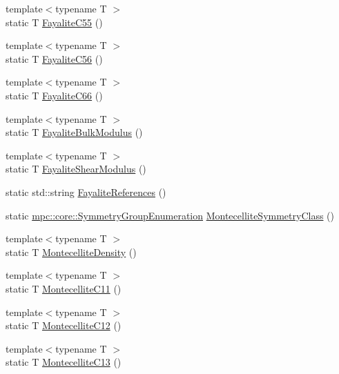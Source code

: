\begin{DoxyCompactItemize}
\item 
{\footnotesize template$<$typename T $>$ }\\static T \mbox{\hyperlink{namespacempc_1_1data_a26a98cb1967f16732ac483590165ad24}{Fayalite\+C55}} ()
\item 
{\footnotesize template$<$typename T $>$ }\\static T \mbox{\hyperlink{namespacempc_1_1data_abd1d44067a331c80523e07355371c8bd}{Fayalite\+C56}} ()
\item 
{\footnotesize template$<$typename T $>$ }\\static T \mbox{\hyperlink{namespacempc_1_1data_abc0687dd7a4a06165d6b81189e8bd786}{Fayalite\+C66}} ()
\item 
{\footnotesize template$<$typename T $>$ }\\static T \mbox{\hyperlink{namespacempc_1_1data_a035f12a2127f0e8704a0c714ef3ae237}{Fayalite\+Bulk\+Modulus}} ()
\item 
{\footnotesize template$<$typename T $>$ }\\static T \mbox{\hyperlink{namespacempc_1_1data_a7d3601cc203324a07c9fbe1b2bada6e4}{Fayalite\+Shear\+Modulus}} ()
\item 
static std\+::string \mbox{\hyperlink{namespacempc_1_1data_ac42b5bd7a3f15a61696037d79a1fad40}{Fayalite\+References}} ()
\item 
static \mbox{\hyperlink{namespacempc_1_1core_a9d979684062547055a0ef5c13077bad8}{mpc\+::core\+::\+Symmetry\+Group\+Enumeration}} \mbox{\hyperlink{namespacempc_1_1data_aae696a475d7a60b1108cf0f27a847307}{Montecellite\+Symmetry\+Class}} ()
\item 
{\footnotesize template$<$typename T $>$ }\\static T \mbox{\hyperlink{namespacempc_1_1data_a853981b197dcdacf81d3691a4b45609c}{Montecellite\+Density}} ()
\item 
{\footnotesize template$<$typename T $>$ }\\static T \mbox{\hyperlink{namespacempc_1_1data_a1cd73c4326e9150c9b59ea2655f2dc4e}{Montecellite\+C11}} ()
\item 
{\footnotesize template$<$typename T $>$ }\\static T \mbox{\hyperlink{namespacempc_1_1data_af9f57609c1ab351fd999e9d231d94a8c}{Montecellite\+C12}} ()
\item 
{\footnotesize template$<$typename T $>$ }\\static T \mbox{\hyperlink{namespacempc_1_1data_a9c1bb28186799335099a03bfcefd5e34}{Montecellite\+C13}} ()
\item 

\end{DoxyCompactItemize}
